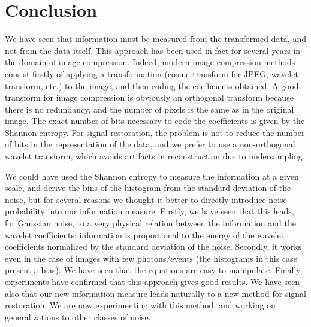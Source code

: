 \newpage
\chapter{Conclusion}

We have seen that information must be measured from the transformed
data, and not from the data itself. This approach has been used in fact
for several years in the domain of image compression. Indeed, modern
image compression methods consist firstly of  applying a transformation 
(cosine transform for JPEG, wavelet transform, etc.) to the image, and
then coding the coefficients obtained. A good transform for
image compression is obviously an orthogonal transform because there
is no redundancy, and the number of pixels is the same as in the original
image. The exact number of bits necessary to code the coefficients is
given by the Shannon entropy. For signal restoration, the problem is
not to reduce the number of bits in the representation of the data, and we
prefer to use a non-orthogonal wavelet transform, which avoids
artifacts in reconstruction due to undersampling. 

We could
have used the Shannon entropy to measure the information at a given scale,
and derive the bins of the histogram from the standard deviation of the noise,
but for several reasons we thought it better to directly introduce 
noise probability into our information measure. 
Firstly, we have seen that this leads, for Gaussian noise, to
a very physical relation between the information and the wavelet coefficients:
information is proportional to the energy of the wavelet coefficients
normalized by the standard deviation of the noise. 
Secondly, it works even in the case
of images with few photons/events (the histograms in this case present a bias).
We have seen that the equations are easy to manipulate. 
Finally, experiments have 
confirmed that this approach gives good results.
We have seen also that our new information
measure leads naturally to a new method for signal restoration. 
We are now experimenting with this method, and working on generalizations to
other classes of noise.

\clearpage
\newpage
